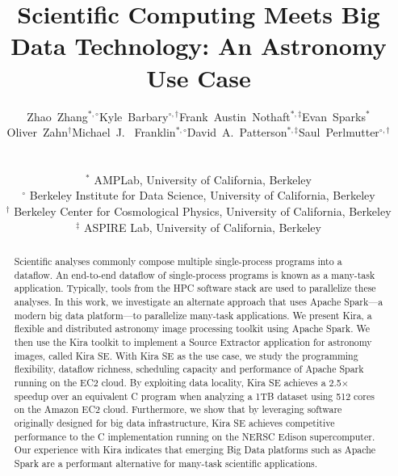 \documentclass[conference]{IEEEtran}
\begin{document}
\title{Scientific Computing Meets Big Data Technology: An Astronomy Use Case}



\author{
\begin{tabular}{cccc}
{Zhao~Zhang$^{*,\circ}$} & {Kyle~Barbary$^{\circ,\dagger}$} & {Frank~Austin~Nothaft$^{*,\ddagger}$} & {Evan~Sparks$^*$} \\
{Oliver~Zahn$^\dagger$} & {Michael~J.~ Franklin$^{*,\circ}$} & {David~A.~Patterson$^{*,\ddagger}$} & {Saul~Perlmutter$^{\circ,\dagger}$}
\end{tabular}
\\\begin{tabular}{c}
$^*$ AMPLab, University of California, Berkeley \\
$^\circ$ Berkeley Institute for Data Science, University of California, Berkeley\\
$^\dagger$ Berkeley Center for Cosmological Physics, University of California, Berkeley\\
$^\ddagger$ ASPIRE Lab, University of California, Berkeley \\
\end{tabular}
} 



\maketitle

\begin{abstract}
Scientific analyses commonly compose multiple single-process programs into a dataflow.
An end-to-end dataflow of single-process programs is known as a many-task application.
Typically, tools from the HPC software stack are used to parallelize these analyses.
In this work, we investigate an alternate approach that uses Apache Spark---a modern big data platform---to parallelize many-task applications.
We present Kira, a flexible and distributed astronomy image processing toolkit using Apache Spark. 
We then use the Kira toolkit to implement a Source Extractor application for astronomy images, called Kira SE.
With Kira SE as the use case, we study the programming flexibility, dataflow richness, scheduling capacity and performance
of Apache Spark running on the EC2 cloud.
By exploiting data locality, Kira SE achieves a 2.5$\times$ speedup over an equivalent C program when analyzing a 1TB
dataset using 512 cores on the Amazon EC2 cloud. 
Furthermore, we show that by leveraging software originally designed for big data infrastructure, Kira SE achieves competitive performance to the C implementation
running on the NERSC Edison supercomputer.
Our experience with Kira indicates that emerging Big Data platforms such as Apache Spark are a performant alternative for many-task scientific applications.  
\end{abstract}
\end{document}
